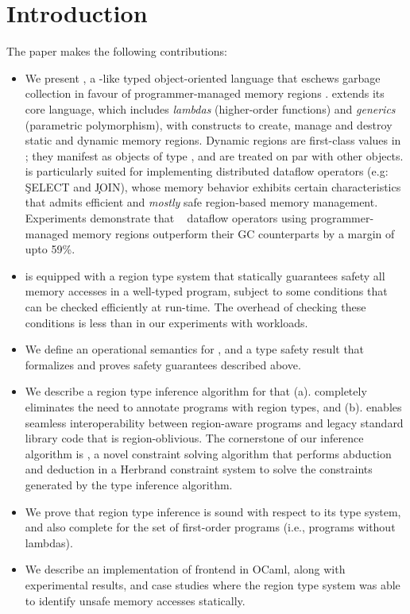 \section{Introduction}
\label{sec:introduction}

The paper makes the following contributions:

\begin{itemize}
  \item We present \name, a \csharp-like typed object-oriented language
  that eschews garbage collection in favour of programmer-managed
  memory regions . \name extends its core language, which includes
  \emph{lambdas} (higher-order functions) and \emph{generics}
  (parametric polymorphism), with constructs to create, manage and
  destroy static and dynamic memory regions. Dynamic regions are
  first-class values in \name; they manifest as objects of type
  , and are treated on par with other objects. \name is
  particularly suited for implementing distributed dataflow operators
  (e.g: \c{SELECT} and \c{JOIN}), whose memory behavior exhibits
  certain characteristics that admits efficient and \emph{mostly} safe
  region-based memory management. Experiments demonstrate that
  \naiad~\cite{naiad} dataflow operators using programmer-managed
  memory regions outperform their GC counterparts by a margin of upto
  59\%. 

  \item \name is equipped with a region type system that statically
  guarantees safety all memory accesses in a well-typed program,
  subject to some conditions that can be checked efficiently at
  run-time. The overhead of checking these conditions is less than
   in our experiments with \naiad workloads.

  \item We define an operational semantics for \name, and a type
  safety result that formalizes and proves safety guarantees described
  above.

  \item We describe a region type inference algorithm for \name that
  (a). completely eliminates the need to annotate \name programs with
  region types, and (b). enables seamless interoperability between
  region-aware \name programs and legacy standard library code that is
  region-oblivious. The cornerstone of our inference algorithm is
  \csolve, a novel constraint solving algorithm that performs
  abduction and deduction in a Herbrand constraint system to solve the
  constraints generated by the type inference algorithm.

  \item We prove that region type inference is sound with respect to
  its type system, and also complete for the set of first-order
  programs (i.e., programs without lambdas). 

  \item We describe an implementation of \name frontend in OCaml,
  along with experimental results, and case studies where the region
  type system was able to identify unsafe memory accesses statically.
  
\end{itemize}

